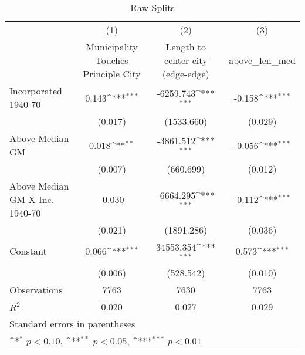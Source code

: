 \begin{table}[htbp]\centering
\def\sym#1{\ifmmode^{#1}\else\(^{#1}\)\fi}
\caption{Raw Splits}
\begin{tabular}{l*{3}{c}}
\hline\hline
                    &\multicolumn{1}{c}{(1)}&\multicolumn{1}{c}{(2)}&\multicolumn{1}{c}{(3)}\\
                    &\multicolumn{1}{c}{Municipality Touches Principle City}&\multicolumn{1}{c}{Length to center city (edge-edge)}&\multicolumn{1}{c}{above\_len\_med}\\
\hline
Incorporated 1940-70&       0.143\sym{***}&   -6259.743\sym{***}&      -0.158\sym{***}\\
                    &     (0.017)         &  (1533.660)         &     (0.029)         \\
[1em]
Above Median GM     &       0.018\sym{**} &   -3861.512\sym{***}&      -0.056\sym{***}\\
                    &     (0.007)         &   (660.699)         &     (0.012)         \\
[1em]
Above Median GM X Inc. 1940-70&      -0.030         &   -6664.295\sym{***}&      -0.112\sym{***}\\
                    &     (0.021)         &  (1891.286)         &     (0.036)         \\
[1em]
Constant            &       0.066\sym{***}&   34553.354\sym{***}&       0.573\sym{***}\\
                    &     (0.006)         &   (528.542)         &     (0.010)         \\
\hline
Observations        &        7763         &        7630         &        7763         \\
\(R^{2}\)           &       0.020         &       0.027         &       0.029         \\
\hline\hline
\multicolumn{4}{l}{\footnotesize Standard errors in parentheses}\\
\multicolumn{4}{l}{\footnotesize \sym{*} \(p<0.10\), \sym{**} \(p<0.05\), \sym{***} \(p<0.01\)}\\
\end{tabular}
\end{table}
